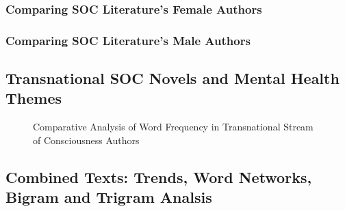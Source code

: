\documentclass[
  letterpaper,
  DIV=11,
  numbers=noendperiod]{scrartcl}
\begin{document}
\subsubsection{Comparing SOC Literature's Female
Authors}\label{comparing-soc-literatures-female-authors}

\subsubsection{Comparing SOC Literature's Male
Authors}\label{comparing-soc-literatures-male-authors}

\subsection{Transnational SOC Novels and Mental Health
Themes}\label{transnational-soc-novels-and-mental-health-themes}

\begin{figure}


\caption{\label{fig-frequency-int}Comparative Analysis of Word Frequency
in Transnational Stream of Consciousness Authors}

\end{figure}%

\newpage

\subsection{Combined Texts: Trends, Word Networks, Bigram and Trigram
Analsis}\label{combined-texts-trends-word-networks-bigram-and-trigram-analsis}
\end{document}
